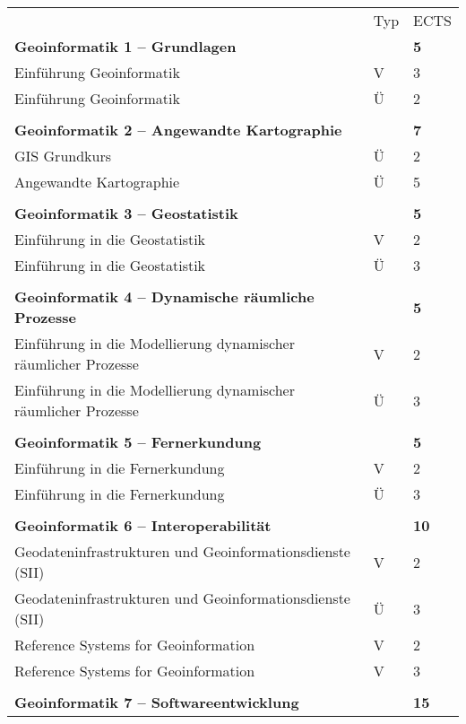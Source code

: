 
\begin{longtable}{p{} p{} p{}}
 & Typ & ECTS \\
\textbf{Geoinformatik 1 -- Grundlagen} & & \textbf{5}\\
Einführung Geoinformatik & V & 3\\
Einführung Geoinformatik & Ü & 2\\
& &\\
\textbf{Geoinformatik 2 -- Angewandte Kartographie} & & \textbf{7}\\
GIS Grundkurs & Ü & 2\\
Angewandte Kartographie & Ü & 5\\
& &\\
\textbf{Geoinformatik 3 -- Geostatistik} & & \textbf{5}\\
Einführung in die Geostatistik & V & 2\\
Einführung in die Geostatistik & Ü & 3\\
&&\\
\textbf{Geoinformatik 4 -- Dynamische räumliche Prozesse} & &\textbf{5}\\
Einführung in die Modellierung dynamischer räumlicher Prozesse & V & 2 \\
Einführung in die Modellierung dynamischer räumlicher Prozesse & Ü & 3\\
&&\\
\textbf{Geoinformatik 5 -- Fernerkundung} && \textbf{5}\\
Einführung in die Fernerkundung & V & 2\\
Einführung in die Fernerkundung & Ü & 3\\
&&\\
\textbf{Geoinformatik 6 -- Interoperabilität}&& \textbf{10}\\
Geodateninfrastrukturen und Geoinformationsdienste (SII) & V & 2\\
Geodateninfrastrukturen und Geoinformationsdienste (SII) & Ü & 3\\
Reference Systems for Geoinformation & V & 2\\
Reference Systems for Geoinformation & V & 3\\
&&\\
\textbf{Geoinformatik 7 -- Softwareentwicklung}&& \textbf{15}\\

\end{longtable}
